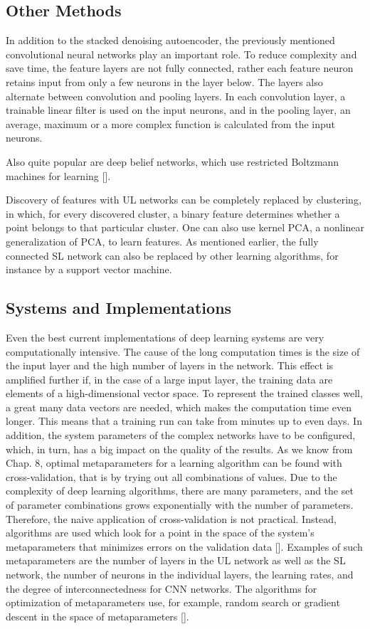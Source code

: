 \documentclass[10pt]{book}
\begin{document}
\subsection{Other Methods}
In addition to the stacked denoising autoencoder, the previously mentioned convolutional neural networks play an important role. To reduce complexity and save time, the feature layers are not fully connected, rather each feature neuron retains input from only a few neurons in the layer below. The layers also alternate between convolution and pooling layers. In each convolution layer, a trainable linear filter is used on the input neurons, and in the pooling layer, an average, maximum or a more complex function is calculated from the input neurons.

Also quite popular are deep belief networks, which use restricted Boltzmann machines for learning [\cite{hinton2006dbn}].

Discovery of features with UL networks can be completely replaced by clustering, in which, for every discovered cluster, a binary feature determines whether a point belongs to that particular cluster. One can also use kernel PCA, a nonlinear generalization of PCA, to learn features. As mentioned earlier, the fully connected SL network can also be replaced by other learning algorithms, for instance by a support vector machine.

\subsection{Systems and Implementations}
Even the best current implementations of deep learning systems are very computationally intensive. The cause of the long computation times is the size of the input layer and the high number of layers in the network. This effect is amplified further if, in the case of a large input layer, the training data are elements of a high-dimensional vector space. To represent the trained classes well, a great many data vectors are needed, which makes the computation time even longer.
This means that a training run can take from minutes up to even days. In addition, the system parameters of the complex networks have to be configured, which, in turn, has a big impact on the quality of the results. As we know from Chap. 8, optimal metaparameters for a learning algorithm can be found with cross-validation, that is by trying out all combinations of values. Due to the complexity of deep learning algorithms, there are many parameters, and the set of parameter combinations grows exponentially with the number of parameters. Therefore, the naive application of cross-validation is not practical. Instead, algorithms are used which look for a point in the space of the system's metaparameters that minimizes errors on the validation data [\cite{bergstra2011hyperparameter}]. Examples of such metaparameters are the number of layers in the UL network as well as the SL network, the number of neurons in the individual layers, the learning rates, and the degree of interconnectedness for CNN networks. The algorithms for optimization of metaparameters use, for example, random search or gradient descent in the space of metaparameters [\cite{maclaurin2015hyperopt}].
\end{document}
